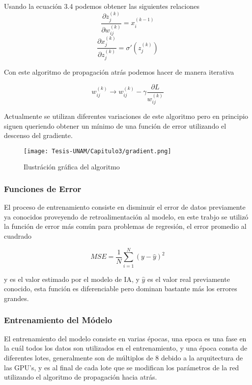 Usando la ecuación 3.4 podemos obtener las siguientes relaciones
$$
    \frac{\partial z_j^{(k)}}{\partial w_{ij}^{(k)}} = x_i^{(k-1)}
$$
$$
    \frac{\partial x_j^{(k)}}{\partial z_j^{(k)}} = \sigma'(z_j^{(k)})
$$

Con este algoritmo de propagación atrás podemos hacer de manera iterativa

\begin{equation}
    w_{ij}^{(k)} \xrightarrow{} w_{ij}^{(k)} - \gamma \frac{\partial L}{w_{ij}^{(k)}}
\end{equation}

Actualmente se utilizan diferentes variaciones de este algoritmo pero en principio siguen queriendo obtener un mínimo de una función de error utilizando el descenso del gradiente.\cite{Aggarwal2024DeepLearning, Beyer}

\begin{figure}[h!]
    \centering
    \texttt{[image: Tesis-UNAM/Capitulo3/gradient.png]}
    \caption{Ilustráción gráfica del algoritmo}
    \label{fig:enter-label}
\end{figure}

\subsubsection{Funciones de Error}
El proceso de entrenamiento consiste en disminuir el error de datos previamente ya conocidos proveyendo de retroalimentación al modelo, en este trabjo se utilizó la función de error más común para problemas de regresión, el error promedio al cuadrado\cite{Aggarwal2024DeepLearning}

$$ MSE = \frac{1}{N}\sum_{i=1}^{N}(y-\hat{y})^2$$

y es el valor estimado por el modelo de IA, y $\hat{y}$  es el valor real previamente conocido, esta función es diferenciable pero dominan bastante más los errores grandes.\cite{Beyer}

\subsubsection{Entrenamiento del Módelo}
El entrenamiento del modelo consiste en varias épocas, una epoca es una fase en la cuál todos los datos son utilizados en el entrenamiento, 
y una época consta de diferentes lotes, generalmente son de múltiplos de 8 debido a la arquitectura de las GPU's, y es al final de cada lote que se modifican los parámetros de la red utilizando el algoritmo de propagación hacia atrás.\\

